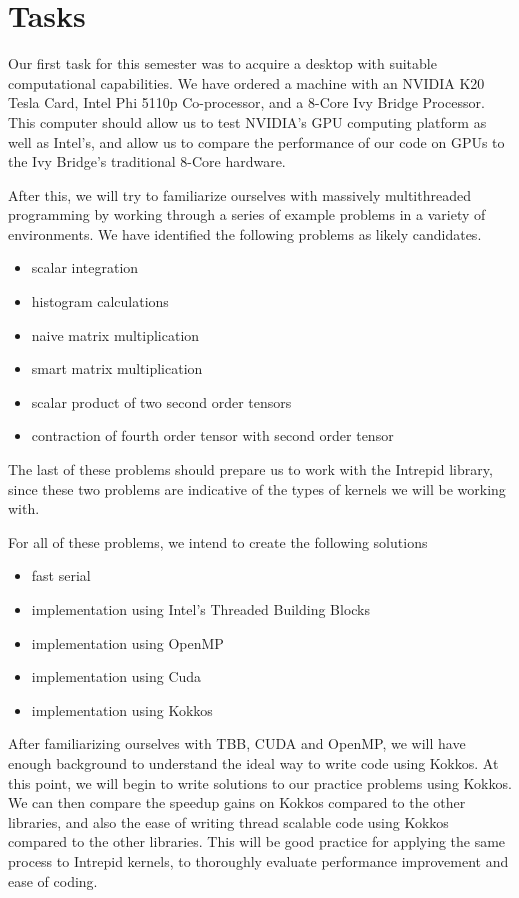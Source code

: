 \documentclass[proposal]{hmcclinic}
\begin{document}
\section{Tasks}

Our first task for this semester was to acquire a desktop with suitable
computational capabilities. We have ordered a machine with an NVIDIA K20 Tesla
Card, Intel Phi 5110p Co-processor, and a 8-Core Ivy Bridge Processor. This
computer should allow us to test NVIDIA's GPU computing platform as well as
Intel's, and allow us to compare the performance of our code on GPUs to the Ivy
Bridge's traditional 8-Core hardware.

After this, we will try to familiarize ourselves with massively multithreaded
programming by working through a series of example problems in a variety of
environments. We have identified the following problems as likely
candidates.
\begin{itemize}
	\item scalar integration
	\item histogram calculations
	\item naive matrix multiplication
	\item smart matrix multiplication
	\item scalar product of two second order tensors 
	\item contraction of fourth order tensor with second order tensor
\end{itemize}
The last of these problems should prepare us to work with the Intrepid library, since these
two problems are indicative of the types of kernels we will be working with.

For all of these problems, we intend to create the following solutions
\begin{itemize}
	\item fast serial
	\item implementation using Intel's Threaded Building Blocks
	\item implementation using OpenMP
	\item implementation using Cuda
	\item implementation using Kokkos
\end{itemize} 

After familiarizing ourselves with TBB, CUDA and OpenMP, we will
have enough background to understand the ideal way to write code using Kokkos. At
this point, we will begin to write solutions to our practice problems using
Kokkos.  We can then compare the speedup gains on Kokkos compared to the other
libraries, and also the ease of writing thread scalable code using Kokkos
compared to the other libraries. This will be good practice for applying the
same process to Intrepid kernels, to thoroughly evaluate performance improvement
and ease of coding.
\end{document}
